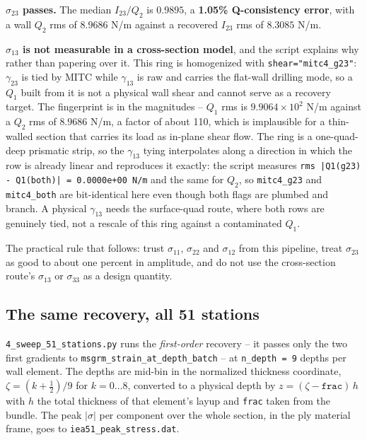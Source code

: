 \textbf{$\sigma_{23}$ passes.} The median $I_{23}/Q_2$ is $0.9895$, a
\textbf{1.05\% Q-consistency error}, with a wall $Q_2$ rms of $8.9686$ N/m
against a recovered $I_{23}$ rms of $8.3085$ N/m.

\textbf{$\sigma_{13}$ is not measurable in a cross-section model}, and the
script explains why rather than papering over it. This ring is homogenized with
\texttt{shear="mitc4\_g23"}: $\gamma_{23}$ is tied by MITC while $\gamma_{13}$
is raw and carries the flat-wall drilling mode, so a $Q_1$ built from it is not
a physical wall shear and cannot serve as a recovery target. The fingerprint is
in the magnitudes -- $Q_1$ rms is $9.9064\times10^{2}$ N/m against a $Q_2$ rms
of $8.9686$ N/m, a factor of about 110, which is implausible for a thin-walled
section that carries its load as in-plane shear flow. The ring is a
one-quad-deep prismatic strip, so the $\gamma_{13}$ tying interpolates along a
direction in which the row is already linear and reproduces it exactly: the
script measures \texttt{rms |Q1(g23) - Q1(both)| = 0.0000e+00 N/m} and the same
for $Q_2$, so \texttt{mitc4\_g23} and \texttt{mitc4\_both} are bit-identical
here even though both flags are plumbed and branch. A physical $\gamma_{13}$
needs the surface-quad route, where both rows are genuinely tied, not a rescale
of this ring against a contaminated $Q_1$.

The practical rule that follows: trust $\sigma_{11}$, $\sigma_{22}$ and
$\sigma_{12}$ from this pipeline, treat $\sigma_{23}$ as good to about one
percent in amplitude, and do not use the cross-section route's $\sigma_{13}$ or
$\sigma_{33}$ as a design quantity.

\subsection*{The same recovery, all 51 stations}

\texttt{4\_sweep\_51\_stations.py} runs the \emph{first-order} recovery -- it
passes only the two first gradients to
\texttt{msgrm\_strain\_at\_depth\_batch} -- at \texttt{n\_depth = 9} depths per
wall element. The depths are mid-bin in the normalized thickness coordinate,
$\zeta = (k + \tfrac12)/9$ for $k = 0 \ldots 8$, converted to a physical depth
by $z = (\zeta - \texttt{frac})\,h$ with $h$ the total thickness of that
element's layup and \texttt{frac} taken from the bundle. The peak $|\sigma|$ per
component over the whole section, in the ply material frame, goes to
\texttt{iea51\_peak\_stress.dat}.

